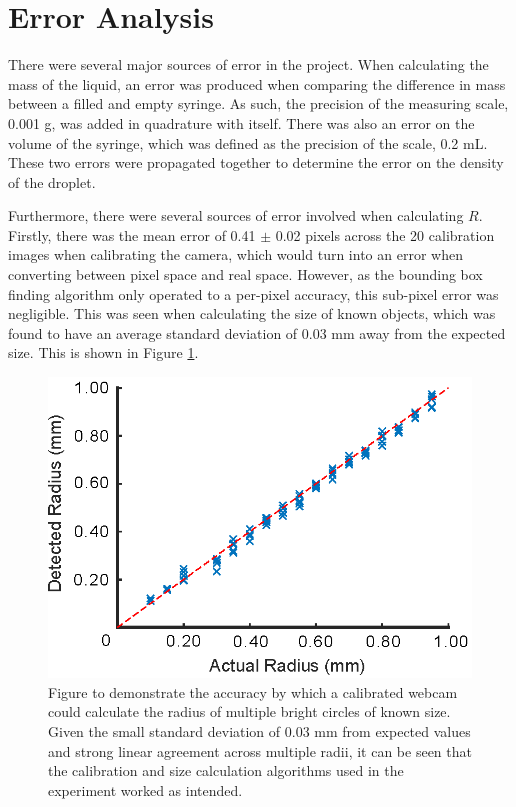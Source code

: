 \documentclass{physics_article_B}
\begin{document}
\section{Error Analysis\label{sect:error}} 
    
    There were several major sources of error in the project. When calculating the mass of the liquid, an error was produced when comparing the difference in mass between a filled and empty syringe. As such, the precision of the measuring scale, 0.001 g, was added in quadrature with itself. There was also an error on the volume of the syringe, which was defined as the precision of the scale, 0.2 mL. These two errors were propagated together to determine the error on the density of the droplet.
    
    Furthermore, there were several sources of error involved when calculating $R$. Firstly, there was the mean error of 0.41 $\pm$ 0.02 pixels across the 20 calibration images when calibrating the camera, which would turn into an error when converting between pixel space and real space. However, as the bounding box finding algorithm only operated to a per-pixel accuracy, this sub-pixel error was negligible. This was seen when calculating the size of known objects, which was found to have an average standard deviation of 0.03 mm away from the expected size. This is shown in Figure \ref{fig:calib:error}. 
        
            \begin{figure}[H]
                \centering
                \hspace*{-1cm}\includegraphics{Figures/CameraCalib.eps}
                \caption{Figure to demonstrate the accuracy by which a calibrated webcam could calculate the radius of multiple bright circles of known size. Given the small standard deviation of 0.03 mm from expected values and strong linear agreement across multiple radii, it can be seen that the calibration and size calculation algorithms used in the experiment worked as intended.}
                \label{fig:calib:error}
            \end{figure}
    
\end{document}
